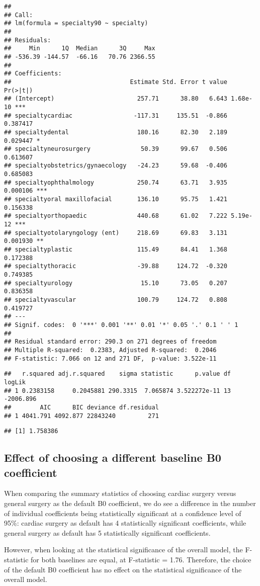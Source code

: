 \documentclass[]{article}
\begin{document}
\begin{verbatim}
## 
## Call:
## lm(formula = specialty90 ~ specialty)
## 
## Residuals:
##     Min      1Q  Median      3Q     Max 
## -536.39 -144.57  -66.16   70.76 2366.55 
## 
## Coefficients:
##                                 Estimate Std. Error t value Pr(>|t|)    
## (Intercept)                       257.71      38.80   6.643 1.68e-10 ***
## specialtycardiac                 -117.31     135.51  -0.866 0.387417    
## specialtydental                   180.16      82.30   2.189 0.029447 *  
## specialtyneurosurgery              50.39      99.67   0.506 0.613607    
## specialtyobstetrics/gynaecology   -24.23      59.68  -0.406 0.685083    
## specialtyophthalmology            250.74      63.71   3.935 0.000106 ***
## specialtyoral maxillofacial       136.10      95.75   1.421 0.156338    
## specialtyorthopaedic              440.68      61.02   7.222 5.19e-12 ***
## specialtyotolaryngology (ent)     218.69      69.83   3.131 0.001930 ** 
## specialtyplastic                  115.49      84.41   1.368 0.172388    
## specialtythoracic                 -39.88     124.72  -0.320 0.749385    
## specialtyurology                   15.10      73.05   0.207 0.836358    
## specialtyvascular                 100.79     124.72   0.808 0.419727    
## ---
## Signif. codes:  0 '***' 0.001 '**' 0.01 '*' 0.05 '.' 0.1 ' ' 1
## 
## Residual standard error: 290.3 on 271 degrees of freedom
## Multiple R-squared:  0.2383, Adjusted R-squared:  0.2046 
## F-statistic: 7.066 on 12 and 271 DF,  p-value: 3.522e-11
\end{verbatim}

\begin{verbatim}
##   r.squared adj.r.squared    sigma statistic      p.value df    logLik
## 1 0.2383158     0.2045881 290.3315  7.065874 3.522272e-11 13 -2006.896
##        AIC      BIC deviance df.residual
## 1 4041.791 4092.877 22843240         271
\end{verbatim}

\begin{verbatim}
## [1] 1.758386
\end{verbatim}

\subsection{Effect of choosing a different baseline B0
coefficient}\label{effect-of-choosing-a-different-baseline-b0-coefficient}

When comparing the summary statistics of choosing cardiac surgery versus
general surgery as the default B0 coefficient, we do see a difference in
the number of individual coefficients being statistically significant at
a confidence level of 95\%: cardiac surgery as default has 4
statistically significant coefficients, while general surgery as default
has 5 statistically significant coefficients.

However, when looking at the statistical significance of the overall
model, the F-statistic for both baselines are equal, at F-statistic =
1.76. Therefore, the choice of the default B0 coefficient has no effect
on the statistical significance of the overall model.
\end{document}
